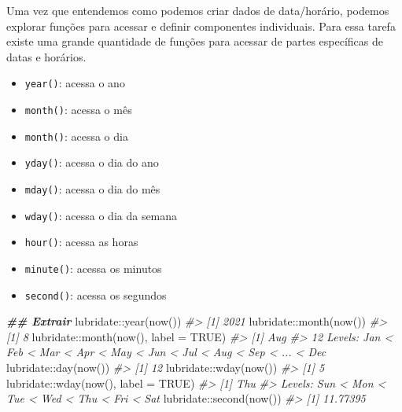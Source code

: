 \documentclass[
]{book}
\newenvironment{Shaded}{\begin{snugshade}}{\end{snugshade}}
\newcommand{\AttributeTok}[1]{\textcolor[rgb]{0.61,0.61,0.61}{#1}}
\newcommand{\CommentTok}[1]{\textcolor[rgb]{0.37,0.37,0.37}{\textit{#1}}}
\newcommand{\ConstantTok}[1]{\textcolor[rgb]{0,0,0}{#1}}
\newcommand{\DocumentationTok}[1]{\textcolor[rgb]{0.37,0.37,0.37}{\textbf{\textit{#1}}}}
\newcommand{\FunctionTok}[1]{\textcolor[rgb]{0,0,0}{#1}}
\newcommand{\NormalTok}[1]{#1}
\newcommand{\SpecialCharTok}[1]{\textcolor[rgb]{0,0,0}{#1}}
\providecommand{\tightlist}{%
  \setlength{\itemsep}{0pt}\setlength{\parskip}{0pt}}
\begin{document}
Uma vez que entendemos como podemos criar dados de data/horário, podemos explorar funções para acessar e definir componentes individuais. Para essa tarefa existe uma grande quantidade de funções para acessar de partes específicas de datas e horários.

\begin{itemize}
\tightlist
\item
  \texttt{year()}: acessa o ano
\item
  \texttt{month()}: acessa o mês
\item
  \texttt{month()}: acessa o dia
\item
  \texttt{yday()}: acessa o dia do ano
\item
  \texttt{mday()}: acessa o dia do mês
\item
  \texttt{wday()}: acessa o dia da semana
\item
  \texttt{hour()}: acessa as horas
\item
  \texttt{minute()}: acessa os minutos
\item
  \texttt{second()}: acessa os segundos
\end{itemize}

\begin{Shaded}
\begin{Highlighting}[]
\DocumentationTok{\#\# Extrair}
\NormalTok{lubridate}\SpecialCharTok{::}\FunctionTok{year}\NormalTok{(}\FunctionTok{now}\NormalTok{())}
\CommentTok{\#\textgreater{} [1] 2021}
\NormalTok{lubridate}\SpecialCharTok{::}\FunctionTok{month}\NormalTok{(}\FunctionTok{now}\NormalTok{())}
\CommentTok{\#\textgreater{} [1] 8}
\NormalTok{lubridate}\SpecialCharTok{::}\FunctionTok{month}\NormalTok{(}\FunctionTok{now}\NormalTok{(), }\AttributeTok{label =} \ConstantTok{TRUE}\NormalTok{)}
\CommentTok{\#\textgreater{} [1] Aug}
\CommentTok{\#\textgreater{} 12 Levels: Jan \textless{} Feb \textless{} Mar \textless{} Apr \textless{} May \textless{} Jun \textless{} Jul \textless{} Aug \textless{} Sep \textless{} ... \textless{} Dec}
\NormalTok{lubridate}\SpecialCharTok{::}\FunctionTok{day}\NormalTok{(}\FunctionTok{now}\NormalTok{())}
\CommentTok{\#\textgreater{} [1] 12}
\NormalTok{lubridate}\SpecialCharTok{::}\FunctionTok{wday}\NormalTok{(}\FunctionTok{now}\NormalTok{())}
\CommentTok{\#\textgreater{} [1] 5}
\NormalTok{lubridate}\SpecialCharTok{::}\FunctionTok{wday}\NormalTok{(}\FunctionTok{now}\NormalTok{(), }\AttributeTok{label =} \ConstantTok{TRUE}\NormalTok{)}
\CommentTok{\#\textgreater{} [1] Thu}
\CommentTok{\#\textgreater{} Levels: Sun \textless{} Mon \textless{} Tue \textless{} Wed \textless{} Thu \textless{} Fri \textless{} Sat}
\NormalTok{lubridate}\SpecialCharTok{::}\FunctionTok{second}\NormalTok{(}\FunctionTok{now}\NormalTok{())}
\CommentTok{\#\textgreater{} [1] 11.77395}
\end{Highlighting}
\end{Shaded}
\end{document}
